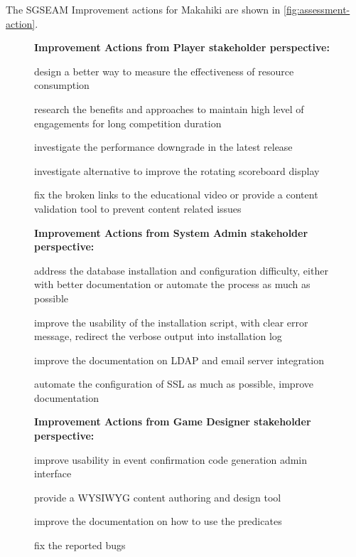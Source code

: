 \clearpage

The SGSEAM Improvement actions for Makahiki are shown in \autoref{fig:assessment-action}.

\begin{figure}[ht!]
\begin{mybox}

\textbf{Improvement Actions from Player stakeholder perspective:}
\begin{compactenum}
\item design a better way to measure the effectiveness of resource consumption 
\item research the benefits and approaches to maintain high level of engagements for long competition duration
\item investigate the performance downgrade in the latest release
\item investigate alternative to improve the rotating scoreboard display
\item fix the broken links to the educational video or provide a content validation tool to prevent content related issues
\end{compactenum}

\textbf{Improvement Actions from System Admin stakeholder perspective:}
\begin{compactenum}
\item address the database installation and configuration difficulty, either with better documentation or automate the process as much as possible
\item improve the usability of the installation script, with clear error message, redirect the verbose output into installation log
\item improve the documentation on LDAP and email server integration
\item automate the configuration of SSL as much as possible, improve documentation
\end{compactenum}

\textbf{Improvement Actions from Game Designer stakeholder perspective:}
\begin{compactenum}
\item improve usability in event confirmation code generation admin interface
\item provide a WYSIWYG content authoring and design tool
\item improve the documentation on how to use the predicates
\item fix the reported bugs 
\end{compactenum}


\end{mybox}
\end{figure}
